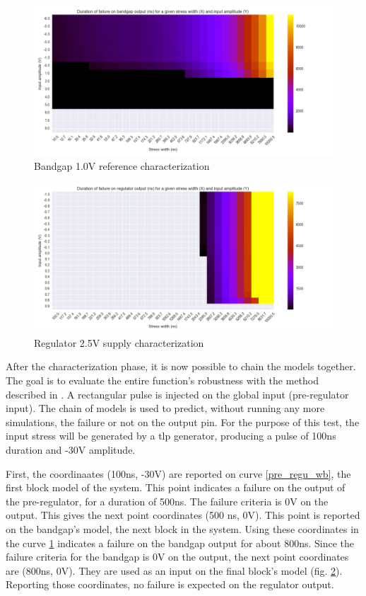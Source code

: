 \begin{figure}[!htbp]
  \centering
  \includegraphics[width=\textwidth]{src/4/figures/bandgap_cz.png}
  \caption{Bandgap 1.0V reference characterization}
  \label{bandgap_wb}
\end{figure}

\begin{figure}[!htbp]
  \centering
  \includegraphics[width=\textwidth]{src/4/figures/regulator_cz.png}
  \caption{Regulator 2.5V supply characterization}
  \label{regu_wb}
\end{figure}

After the characterization phase, it is now possible to chain the models together.
The goal is to evaluate the entire function's robustness with the method described in \label{sec:block-chaining}.
A rectangular pulse is injected on the global input (pre-regulator input).
The chain of models is used to predict, without running any more simulations, the failure or not on the output pin.
For the purpose of this test, the input stress will be generated by a \gls{tlp} generator, producing a pulse of 100ns duration and -30V amplitude.

First, the coordinaates (100ns, -30V) are reported on curve \ref{pre_regu_wb}, the first block model of the system.
This point indicates a failure on the output of the pre-regulator, for a duration of 500ns.
The failure criteria is 0V on the output.
This gives the next point coordinates (500 ns, 0V).
This point is reported on the bandgap's model, the next block in the system.
Using these coordinates in the curve \ref{bandgap_wb} indicates a failure on the bandgap output for about 800ns.
Since the failure criteria for the bandgap is 0V on the output, the next point coordinates are (800ns, 0V).
They are used as an input on the final block's model (fig. \ref{regu_wb}).
Reporting those coordinates, no failure is expected on the regulator output.

